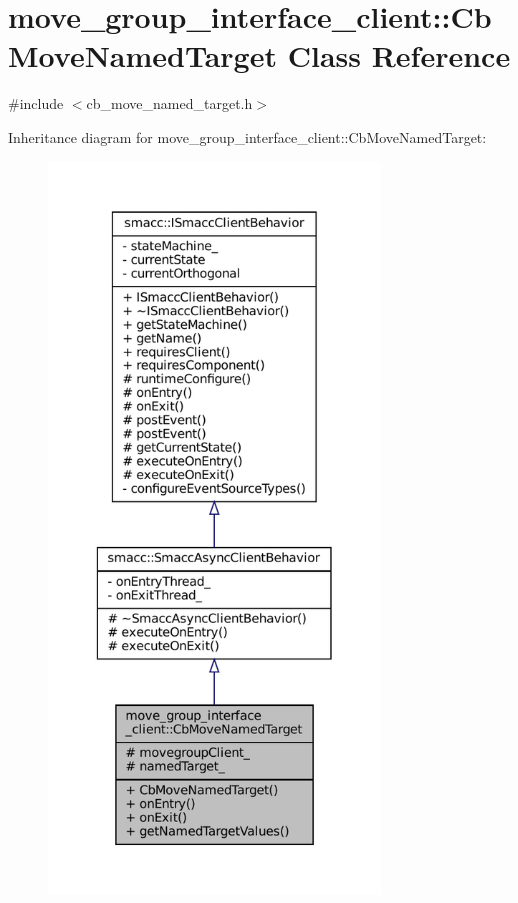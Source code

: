 \hypertarget{classmove__group__interface__client_1_1CbMoveNamedTarget}{}\section{move\+\_\+group\+\_\+interface\+\_\+client\+:\+:Cb\+Move\+Named\+Target Class Reference}
\label{classmove__group__interface__client_1_1CbMoveNamedTarget}


{\ttfamily \#include $<$cb\+\_\+move\+\_\+named\+\_\+target.\+h$>$}



Inheritance diagram for move\+\_\+group\+\_\+interface\+\_\+client\+:\+:Cb\+Move\+Named\+Target\+:
\nopagebreak
\begin{figure}[H]
\begin{center}
\leavevmode
\includegraphics[height=550pt]{classmove__group__interface__client_1_1CbMoveNamedTarget__inherit__graph}
\end{center}
\end{figure}


